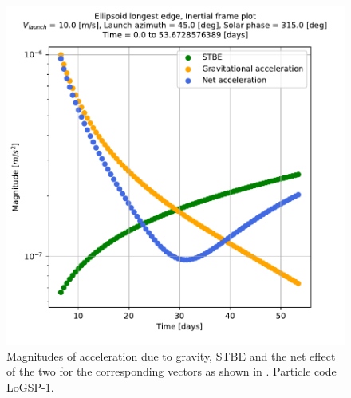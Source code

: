 \begin{figure}[htb]
\centering
\captionsetup{justification=centering}
\includegraphics[width=\linewidth, height=0.50\textheight, keepaspectratio=true]{longest_edge_perturbations/3.2Density_1cmSize/10ms_45Azimuth_315SolarPhase/noSRP_acceleration_magnitudes.pdf}
\caption{Magnitudes of acceleration due to gravity, \gls{STBE} and the net effect of the two for the corresponding vectors as shown in . Particle code LoGSP-1.}
\label{fig:LoGSP_1_capture_case_5_2d_acceleration_magnitudes_noSRP}
\end{figure}
\FloatBarrier

